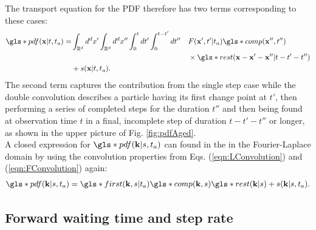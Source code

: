 The transport equation for the \gls*{PDF} therefore has two terms corresponding to these cases:
%
\begin{alignat}{2}
\gls*{pdf}(\ve{x}|t,t_a) = & \int_{\mathbb{R}^d} d^{d}x' \int_{\mathbb{R}^d} d^{d}x'' \int_{0}^{t} dt' \int_{0}^{t-t'} d t'' &&  F(\ve{x}',t'|t_a) \gls*{comp}(\ve{x}'',t'')\nonumber \\
& && \times  \gls*{rest}(\ve{x}-\ve{x}'-\ve{x}''| t-t'-t'')\nonumber \\
& + s(\ve{x}|t,t_a) . && 
\end{alignat}
%
The second term captures the contribution from the single step case while the double convolution describes a particle having its first change point at $t'$, then performing a series of completed steps for the duration $t''$ and then being found at observation time $t$ in a final, incomplete step of duration $t-t'-t''$ or longer, as shown in the upper picture of Fig. \ref{fig:pdfAged}.\\
A closed expression for $\gls*{pdf}(\ve{k}|s,t_a)$ can found in the in the Fourier-Laplace domain by using the convolution properties from Eqs.  (\ref{eqn:LConvolution}) and (\ref{eqn:FConvolution}) again:
%
\begin{align}
\gls*{pdf}(\ve{k}|s,t_a) =  \gls*{first}(\ve{k},s|t_a)  \gls*{comp}(\ve{k},s) \gls*{rest}(\ve{k}|s) + s(\ve{k}|s,t_a) \label{eqn:pdfAgedFourierLaplace}.
\end{align}


\subsection{Forward waiting time and step rate} 
\label{sec:forwardWaiting}

